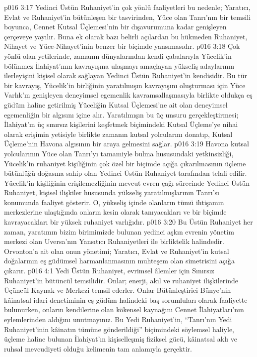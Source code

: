 \vs p016 3:17 Yedinci Üstün Ruhaniyet’in çok yönlü faaliyetleri bu nedenle; Yaratıcı, Evlat ve Ruhaniyet’in  bütünleşen bir tasvirinden, Yüce olan Tanrı’nın  bir temsili boyunca, Cennet Kutsal Üçlemesi’nin bir dışavurumuna kadar genişleyen çerçeveye yayılır. Buna ek olarak bazı belirli açılardan bu hükmeden Ruhaniyet, Nihayet ve Yüce\hyp{}Nihayet’inin  benzer bir biçimde yansımasıdır.
\vs p016 3:18 Çok yönlü olan yetilerinde, zamanın dünyalarından kendi çabalarıyla Yücelik’in bölünmez İlahiyat’ının kavrayışına ulaşmayı amaçlayan yükseliş adaylarının ilerleyişini kişisel olarak sağlayan Yedinci Üstün Ruhaniyet’in kendisidir. Bu tür bir kavrayış, Yücelik’in birliğinin yaratılmışın kavrayışını oluşturması için Yüce Varlık’ın genişleyen deneyimsel egemenlik kavramsallaşmasıyla birlikte oldukça eş güdüm haline getirilmiş Yüceliğin Kutsal Üçlemesi’ne ait olan deneyimsel egemenliğin bir algısını içine alır. Yaratılmışın bu üç unsuru gerçekleştirmesi; İlahiyat’ın üç sınırsız kişilerini keşfetmek biçimindeki Kutsal Üçleme’ye nihai olarak erişimin yetisiyle birlikte zamanın kutsal yolcularını donatıp, Kutsal Üçleme’nin Havona algısının bir araya gelmesini sağlar.
\vs p016 3:19 Havona kutsal yolcularının Yüce olan Tanrı’yı tamamiyle bulma hususundaki yetkinsizliği, Yücelik’in ruhaniyet kişiliğinin çok özel bir biçimde açığa çıkarılmasının üçleme bütünlüğü doğasına sahip olan Yedinci Üstün Ruhaniyet tarafından telafi edilir. Yücelik’in kişiliğinin erişilemezliğinin mevcut evren çağı sürecinde Yedinci Üstün Ruhaniyet, kişisel ilişkiler hususunda yükseliş yaratılmışlarının Tanrı’sı konumunda faaliyet gösterir. O, yükseliş içinde olanların tümü ihtişamın merkezlerine ulaştığında onların kesin olarak tanıyacakları ve bir biçimde kavrayacakları bir yüksek ruhaniyet varlığıdır.
\vs p016 3:20 Bu Üstün Ruhaniyet her zaman, yaratımın bizim birimimizde bulunan yedinci aşkın evrenin yönetim merkezi olan Uversa’nın Yansıtıcı Ruhaniyetleri ile birliktelik halindedir. Orvonton’a ait olan onun yönetimi; Yaratıcı, Evlat ve Ruhaniyet’in kutsal doğalarının eş güdümsel harmanlanmasının muhteşem olan simetrisini açığa çıkarır.
\vs p016 4:1 Yedi Üstün Ruhaniyet, evrimsel âlemler için Sınırsız Ruhaniyet’in bütüncül temsilidir. Onlar; enerji, akıl ve ruhaniyet ilişkilerinde Üçüncül Kaynak ve Merkezi temsil ederler. Onlar Bütünleştirici Bünye’nin kâinatsal idari denetiminin eş güdüm halindeki baş sorumluları olarak faaliyette bulunurken, onların kendilerine olan kökensel kaynağını Cennet İlahiyatları’nın eylemlerinden aldığını unutmayınız. Bu Yedi Ruhaniyet’in, “Tanrı'nın Yedi Ruhaniyet’inin kâinatın tümüne gönderildiği” biçimindeki söylemsel haliyle, üçleme haline bulunan İlahiyat’ın kişiselleşmiş fiziksel gücü, kâinatsal aklı ve ruhsal mevcudiyeti olduğu kelimenin tam anlamıyla gerçektir.
